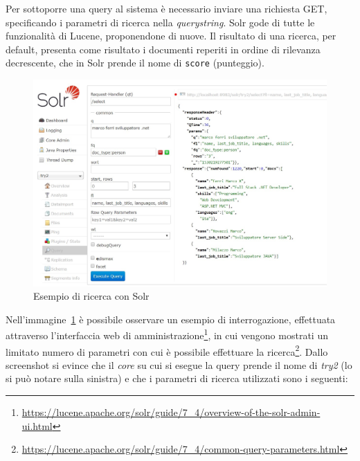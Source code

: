 Per sottoporre una query al sistema è necessario inviare una richiesta GET, specificando i parametri di ricerca nella \textit{querystring}. Solr gode di tutte le funzionalità di Lucene, proponendone di nuove. Il risultato di una ricerca, per default, presenta come risultato i documenti reperiti in ordine di rilevanza decrescente, che in Solr prende il nome di \texttt{score} (punteggio).

\begin{figure}[H]
	\centering
	\includegraphics[scale=0.48]{../images/02_1_esempio_ricerca}
	\caption[Esempio di ricerca con Solr]{Esempio di ricerca con Solr}
	\label{fig:searchexample}
\end{figure}

\vspace{1.5em}

Nell’immagine~\ref{fig:searchexample} è possibile osservare un esempio di interrogazione, effettuata attraverso l'interfaccia web di amministrazione\footnote{\url{https://lucene.apache.org/solr/guide/7\_4/overview-of-the-solr-admin-ui.html}}, in cui vengono mostrati un limitato numero di parametri con cui è possibile effettuare la ricerca\footnote{\url{https://lucene.apache.org/solr/guide/7_4/common-query-parameters.html}}. Dallo screenshot si evince che il \textit{core} su cui si esegue la query prende il nome di \textit{try2} (lo si può notare sulla sinistra) e che i parametri di ricerca utilizzati sono i seguenti:

